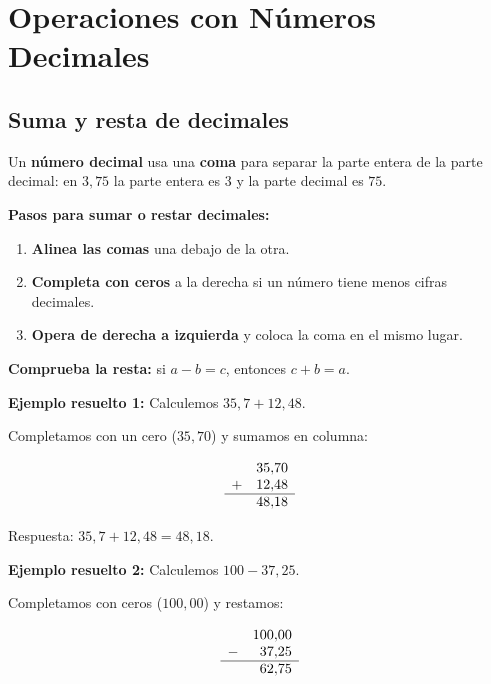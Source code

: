 \documentclass[12pt, letterpaper]{article}
\begin{document}
\newpage

\section{Operaciones con Números Decimales}

\subsection{Suma y resta de decimales}

Un \textbf{número decimal} usa una \textbf{coma} para separar la parte entera de la parte decimal: en $3{,}75$ la parte entera es $3$ y la parte decimal es $75$.

\begin{cuadropasos}
  \textbf{Pasos para sumar o restar decimales:}
  \begin{enumerate}
    \item \textbf{Alinea las comas} una debajo de la otra.
    \item \textbf{Completa con ceros} a la derecha si un número tiene menos cifras decimales.
    \item \textbf{Opera de derecha a izquierda} y coloca la coma en el mismo lugar.
  \end{enumerate}
  \textbf{Comprueba la resta:} si $a - b = c$, entonces $c + b = a$.
\end{cuadropasos}

\noindent\textbf{Ejemplo resuelto 1:} Calculemos $35{,}7 + 12{,}48$.

Completamos con un cero ($35{,}70$) y sumamos en columna:

\[
  \begin{array}{rr}
      & 35{,}70 \\
    + & 12{,}48 \\ \hline
      & 48{,}18
  \end{array}
\]

\noindent Respuesta: $35{,}7 + 12{,}48 = 48{,}18$.

\noindent\textbf{Ejemplo resuelto 2:} Calculemos $100 - 37{,}25$.

Completamos con ceros ($100{,}00$) y restamos:

\[
  \begin{array}{rr}
      & 100{,}00 \\
    - & 37{,}25   \\ \hline
      & 62{,}75
  \end{array}
\]
\end{document}
